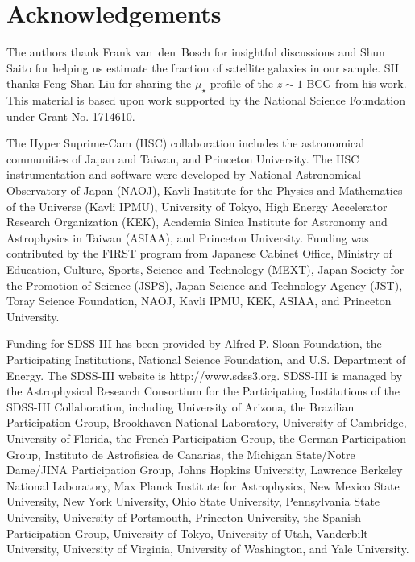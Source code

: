 \documentclass[a4paper,fleqn,usenatbib]{mnras}
\def\mden{{$\mu_{\star}$}}
\begin{document}
\section*{Acknowledgements}

  The authors thank Frank van~den~Bosch for insightful discussions and 
  Shun Saito for helping us estimate the fraction of satellite galaxies in our sample.
  SH thanks Feng-Shan Liu for sharing the \mden{} profile of the $z\sim1$ BCG from 
  his work. This material is based upon work supported by the National Science Foundation under Grant No. 1714610.

  The Hyper Suprime-Cam (HSC) collaboration includes the astronomical communities of 
  Japan and Taiwan, and Princeton University.  The HSC instrumentation and software were
  developed by National Astronomical Observatory of Japan (NAOJ), Kavli Institute
  for the Physics and Mathematics of the Universe (Kavli IPMU), University of Tokyo,
  High Energy Accelerator Research Organization (KEK), Academia Sinica Institute
  for Astronomy and Astrophysics in Taiwan (ASIAA), and Princeton University.  
  Funding was contributed by the FIRST program from Japanese Cabinet Office,  Ministry 
  of Education, Culture, Sports, Science and Technology (MEXT), Japan Society for 
  the Promotion of Science (JSPS), Japan Science and Technology Agency (JST), Toray 
  Science Foundation, NAOJ, Kavli IPMU, KEK, ASIAA, and Princeton University.
   
  Funding for SDSS-III has been provided by Alfred P. Sloan Foundation, the 
  Participating Institutions, National Science Foundation, and U.S. Department of
  Energy. The SDSS-III website is http://www.sdss3.org.  SDSS-III is managed by the
  Astrophysical Research Consortium for the Participating Institutions of the SDSS-III
  Collaboration, including University of Arizona, the Brazilian Participation Group,
  Brookhaven National Laboratory, University of Cambridge, University of Florida, the
  French Participation Group, the German Participation Group, Instituto de Astrofisica
  de Canarias, the Michigan State/Notre Dame/JINA Participation Group, Johns Hopkins
  University, Lawrence Berkeley National Laboratory, Max Planck Institute for
  Astrophysics, New Mexico State University, New York University, Ohio State University,
  Pennsylvania State University, University of Portsmouth, Princeton University, the
  Spanish Participation Group, University of Tokyo, University of Utah, Vanderbilt
  University, University of Virginia, University of Washington, and Yale University.
  
\end{document}
